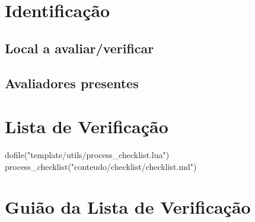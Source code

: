 %

\tableofcontents
\newpage


\section{Identificação}\label{sec:identificacao}

\subsection{Local a avaliar/verificar}\label{subsec:local-a-avaliar/verificar}



\subsection{Avaliadores presentes}\label{subsec:avaliadores-presentes}



\newpage

\section{Lista de Verificação}\label{sec:lista-de-verificacao}

\begin{footnotesize}
    \begin{luacode}
    dofile("template/utils/process_checklist.lua")
    process_checklist("conteudo/checklist/checklist.md")
    \end{luacode}
\end{footnotesize}
\newpage

\section{Guião da Lista de Verificação}\label{sec:guiao-da-lista-de-verificacao}
\newpage


\printbibliography[title={Referências}]
